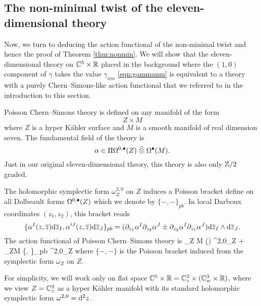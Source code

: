 \subsection{The non-minimal twist of the eleven-dimensional theory}

Now, we turn to deducing the action functional of the non-minimal twist and hence the proof of Theorem \ref{thm:nonmin}. 
We will show that the eleven-dimensional theory on $\mathbb C^5 \times \mathbb R$ placed in the background where the $(1,0)$ component of $\gamma$ takes the value $\gamma_{nm}$ \eqref{eqn:gammanm} is equivalent to a theory with a purely Chern--Simons-like action functional that we referred to in the introduction to this section. 

Poisson Chern--Simons theory is defined on any manifold of the form
\[
Z \times M
\]
where $Z$ is a hyper K\"ahler surface and $M$ is a smooth manifold of real dimension seven. 
The fundamental field of the theory is  
\[
\alpha \in \Pi \Omega^{0,\bullet}(Z) \; \widehat{\otimes} \; \Omega^\bullet(M)  .
\]
Just in our original eleven-dimensional theory, this theory is also only $\mathbb Z/2$ graded. 

The holomorphic symplectic form $\omega_Z^{2,0}$ on $Z$ induces a Poisson bracket define on all Dolbeault forms $\Omega^{0,\bullet}(Z)$ which we denote by $\{-,-\}_{pb}$. 
In local Darboux coordinates $(z_1,z_2)$, this bracket reads
\[
\{\alpha^I (z,\overline{z}) {\rm d} \overline{z}_I , \alpha'^J (z,\overline{z}) {\rm d} \overline{z}_J\}_{pb} = (\partial_{z_1} \alpha^I \partial_{z_2} \alpha^J \pm \partial_{z_2} \alpha^I \partial_{z_1} \alpha^J) {\rm d} \overline{z}_I \wedge {\rm d} \overline{z}_J . 
\]
The action functional of Poisson Chern--Simons theory is 
\beqn\label{eqn:pcsaction}
     \int_{Z \times M} (\alpha \wedge \d\alpha) \wedge \omega^{2,0}_Z  +  \int_{Z\times M} \alpha \wedge \{\alpha, \alpha\}_{pb} \wedge \omega^{2,0}_Z
\eeqn
where $\{-,-\}$ is the Poisson bracket induced from the symplectic form $\omega_Z$ on $Z$. 

For simplicity, we will work only on flat space $\mathbb C^5 \times \mathbb R = \mathbb C^2_z \times (\mathbb C^3_w \times \mathbb R)$, where we view $Z = \mathbb C^2_z$ as a hyper K\"ahler manifold with its standard holomorphic symplectic form $\omega^{2,0} = {\rm d}^2 z$.

